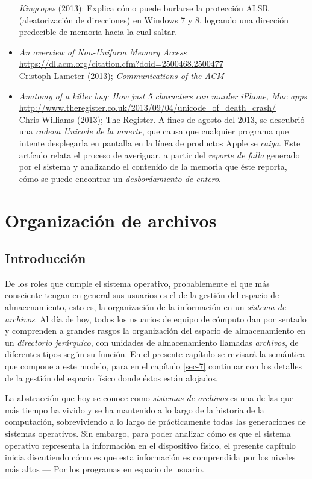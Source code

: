 \documentclass[11pt,fleqn]{book} %
\newcommand{\otrorec}[1]{ \\ {\small \url{#1}} \\ }
\begin{document}
\begin{itemize}
  \emph{Kingcopes} (2013):
  Explica cómo puede burlarse la protección ALSR (aleatorización de
  direcciones) en Windows 7 y 8, logrando una dirección predecible de
  memoria hacia la cual saltar.
\item \emph{An overview of Non-Uniform Memory Access}
  \otrorec{https://dl.acm.org/citation.cfm?doid=2500468.2500477}
  Cristoph Lameter (2013); \emph{Communications of the ACM}
\item \emph{Anatomy of a killer bug: How just 5 characters can murder iPhone,   Mac apps}
  \otrorec{http://www.theregister.co.uk/2013/09/04/unicode_of_death_crash/}
  Chris Williams (2013); The Register. A fines de agosto del 2013, se
  descubrió una \emph{cadena Unicode de la muerte}, que causa que cualquier
  programa que intente desplegarla en pantalla en la línea de
  productos Apple se \emph{caiga}. Este artículo relata el proceso de
  averiguar, a partir del \emph{reporte de falla} generado por el sistema y
  analizando el contenido de la memoria que éste reporta, cómo se
  puede encontrar un \emph{desbordamiento de entero}.
\end{itemize}
\chapter{Organización de archivos}
\label{sec-6}
\section{Introducción}
\label{sec-6-1}
\label{DIR}


De los roles que cumple el sistema operativo, probablemente el que más
consciente tengan en general sus usuarios es el de la gestión del
espacio de almacenamiento, esto es, la organización de la información
en un \emph{sistema de archivos}. Al día de
hoy, todos los usuarios de equipo de cómputo dan por sentado y
comprenden a grandes rasgos la organización del espacio de
almacenamiento en un \emph{directorio jerárquico}, con unidades de
almacenamiento llamadas \emph{archivos}, de diferentes tipos según su
función. En el presente capítulo se revisará la semántica que compone
a este modelo, para en el capítulo \ref{sec-7} continuar con los detalles de la
gestión del espacio físico donde éstos están alojados.

La abstracción que hoy se conoce como \emph{sistemas de archivos} es una de
las que más tiempo ha vivido y se ha mantenido a lo largo de la
historia de la computación, sobreviviendo a lo largo de prácticamente
todas las generaciones de sistemas operativos. Sin embargo, para poder
analizar cómo es que el sistema operativo representa la información en
el dispositivo físico, el presente capítulo inicia discutiendo cómo es
que esta información es comprendida por los niveles más altos — Por
los programas en espacio de usuario.
\end{document}

